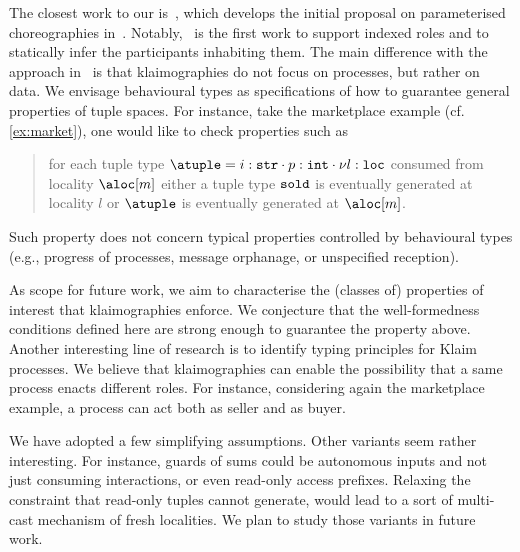 The closest work to our is~\cite{chjny19}, which develops the initial
proposal on parameterised choreographies in~\cite{ydbh10,dybh12}.
%
Notably,~\cite{chjny19} is the first work to support indexed roles and
to statically infer the participants inhabiting them.
%
The main difference with the approach in~\cite{chjny19} is that
klaimographies do not focus on processes, but rather on data.
%
We envisage behavioural types as specifications of how to guarantee
general properties of tuple spaces.
%
For instance, take the marketplace example (cf. \cref{ex:market}),
one would like to check properties such as
\begin{quote}
  for each tuple type
  $\atuple = {{i : \asort[str]} \cdot {p : \asort[int]} \cdot {\nu l :
      \asort[loc]}}$ consumed from locality $\aloc[m]$ either a tuple type
  $\asort[sold]$ is eventually generated at locality $l$ or $\atuple$
  is eventually generated at $\aloc[m]$.
\end{quote}
%
Such property does not concern typical properties
controlled by behavioural types (e.g., progress of processes, message
orphanage, or unspecified reception).

As scope for future work, we aim to characterise the (classes of)
properties of interest that klaimographies enforce.
%
We conjecture that the well-formedness conditions defined here
are strong enough to guarantee the property above.
%
Another interesting line of research is to identify typing principles
for Klaim processes.
%
We believe that klaimographies can enable the possibility that a same
process enacts different roles.
%
For instance, considering again the marketplace example, a process
can act both as seller and as buyer.

We have adopted a few simplifying assumptions.
%
Other variants seem rather interesting.
%
For instance, guards of sums could be autonomous inputs and not just
consuming interactions, or even read-only access prefixes.
%
Relaxing the constraint that read-only tuples cannot generate, would
lead to a sort of multi-cast mechanism of fresh localities.
%
We plan to study those variants in future work.


